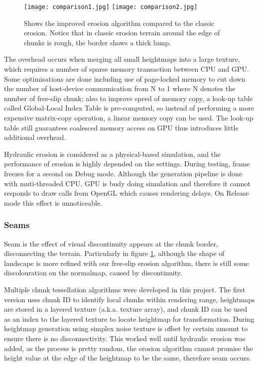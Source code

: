 \documentclass[oneside, a4paper]{article}
\begin{document}
    \begin{figure}[H]
        \center
        \texttt{[image: comparison1.jpg]}
        \texttt{[image: comparison2.jpg]}
        \caption{Shows the improved erosion algorithm compared to the classic erosion. Notice that in classic erosion terrain around the edge of chunks is rough, the border shows a thick lump.}
        \label{erosion_seams}
    \end{figure}

    The overhead occurs when merging all small heightmaps into a large texture, which requires a number of sparse memory transaction between CPU and GPU. Some optimisations are done including use of page-locked memory to cut down the number of host-device communication from N to 1 where N denotes the number of free-slip chunk; also to improve speed of memory copy, a look-up table called Global-Local Index Table is pre-computed, so instead of performing a more expensive matrix-copy operation, a linear memory copy can be used. The look-up table still guarantees coalesced memory access on GPU thus introduces little additional overhead.

    Hydraulic erosion is considered as a physical-based simulation, and the performance of erosion is highly depended on the settings. During testing, frame freezes for a second on Debug mode. Although the generation pipeline is done with muti-threaded CPU, GPU is budy doing simulation and therefore it cannot responds to draw calls from OpenGL which causes rendering delays. On Release mode this effect is unnoticeable.

    \subsubsection{Seams}

    Seam is the effect of visual discontinuity appears at the chunk border, disconnecting the terrain. Particularly in figure \ref{erosion_seams}, although the shape of landscape is more refined with our free-slip erosion algorithm, there is still some discolouration on the normalmap, caused by discontinuity.

    Multiple chunk tessellation algorithms were developed in this project. The first version uses chunk ID to identify local chunks within rendering range, heightmaps are stored in a layered texture (a.k.a. texture array), and chunk ID can be used as an index to the layered texture to locate heightmap for transformation. During heightmap generation using simplex noise texture is offset by certain amount to ensure there is no disconnectivity. This worked well until hydraulic erosion was added, as the process is pretty random, the erosion algorithm cannot promise the height value at the edge of the heightmap to be the same, therefore seam occurs.
\end{document}
